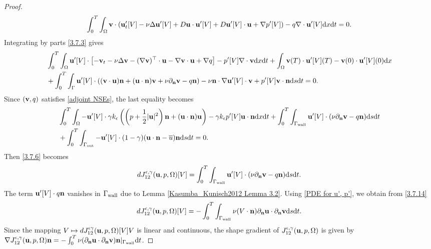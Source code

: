 \documentclass[oneside,11pt]{book}
\numberwithin{equation}{section}
\begin{document}
\begin{proof}
\begin{align}
        \label{3.7.3}
        \int_0^T\int_\Omega {\bf v}\cdot({\bf u}'_t[V] - \nu\Delta{\bf u}'[V] + D{\bf u}\cdot{\bf u}'[V] + D{\bf u}'[V]\cdot{\bf u} + \nabla p'[V]) - q\nabla\cdot{\bf u}'[V] {\rm d}x{\rm d}t = 0.
    \end{align}
    Integrating by parts \eqref{3.7.3} gives
    \begin{align}
        &\int_0^T\int_\Omega {\bf u}'[V]\cdot\left[-{\bf v}_t -\nu\Delta{\bf v} - (\nabla{\bf v})^\top\cdot{\bf u} - \nabla{\bf v}\cdot{\bf u} + \nabla q\right] - p'[V]\nabla\cdot{\bf v}{\rm d}x{\rm d}t + \int_\Omega {\bf v}(T)\cdot{\bf u}'[V](T) - {\bf v}(0)\cdot{\bf u}'[V](0){\rm d}x\\
        &+ \int_0^T\int_\Gamma {\bf u}'[V]\cdot(({\bf v}\cdot{\bf u}){\bf n} + ({\bf u}\cdot{\bf n}){\bf v} + \nu\partial_{\bf n}{\bf v} - q{\bf n}) - \nu{\bf n}\cdot\nabla{\bf u}'[V]\cdot{\bf v} + p'[V]{\bf v}\cdot{\bf n}{\rm d}s{\rm d}t = 0.
    \end{align}
    Since $({\bf v},q)$ satisfies \eqref{adjoint NSEs}, the last equality becomes
    \begin{align}
        &\int_0^T\int_\Omega -{\bf u}'[V]\cdot\gamma k_\epsilon\left(\left(p + \frac{1}{2}|{\bf u}|^2\right){\bf n} + ({\bf u}\cdot{\bf n}){\bf u}\right) - \gamma k_\epsilon p'[V]{\bf u}\cdot{\bf n}{\rm d}x{\rm d}t + \int_0^T\int_{\Gamma_{\rm wall}} {\bf u}'[V]\cdot(\nu\partial_{\bf n}{\bf v} - q{\bf n}){\rm d}s{\rm d}t\\
        &+ \int_0^T\int_{\Gamma_{\rm out}} -{\bf u}'[V]\cdot(1 - \gamma)({\bf u}\cdot{\bf n} - \overline{u}){\bf n}{\rm d}s{\rm d}t = 0.
    \end{align}
    Then \eqref{3.7.6} becomes
    \begin{align}
        \label{3.7.14}
        dJ_{12}^{\epsilon,\gamma}({\bf u},p,\Omega)[V] = \int_0^T\int_{\Gamma_{\rm wall}} {\bf u}'[V]\cdot(\nu\partial_{\bf n}{\bf v} - q{\bf n}){\rm d}s{\rm d}t.
    \end{align}
    The term ${\bf u}'[V]\cdot q{\bf n}$ vanishes in $\Gamma_{\rm wall}$ due to Lemma \ref{Kasumba_Kunisch2012 Lemma 3.2}. Using \eqref{PDE for u', p'}, we obtain from \eqref{3.7.14}
    \begin{align}
        dJ_{12}^{\epsilon,\gamma}({\bf u},p,\Omega)[V] = -\int_0^T\int_{\Gamma_{\rm wall}} \nu(V\cdot{\bf n})\partial_{\bf n}{\bf u}\cdot\partial_{\bf n}{\bf v}{\rm d}s{\rm d}t.
    \end{align}
    Since the mapping $V\mapsto dJ_{12}^{\epsilon\gamma}({\bf u},p,\Omega)[V]V$ is linear and continuous, the shape gradient of $J_{12}^{\epsilon,\gamma}({\bf u},p,\Omega)$ is given by $\nabla J_{12}^{\epsilon,\gamma}({\bf u},p,\Omega){\bf n} = -\int_0^T \nu(\partial_{\bf n}{\bf u}\cdot\partial_{\bf n}{\bf v}){\bf n}|_{\Gamma_{\rm wall}}{\rm d}t$.
    

\end{proof}
\end{document}
